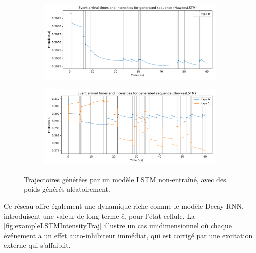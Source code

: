 \documentclass[../main.tex]{subfiles}
\begin{document}
\begin{figure}[!h]
	\begin{subfigure}{\linewidth}
		\includegraphics[width=\linewidth]{../notebooks/example_lstmplot.pdf}
	\end{subfigure}
	\begin{subfigure}{\linewidth}
		\includegraphics[width=\linewidth]{../notebooks/example_lstmplot2d.pdf}
	\end{subfigure}
	\caption{Trajectoires générées par un modèle LSTM non-entraîné, avec des poids générés aléatoirement.}\label{fig:exampleLSTMIntensityTraj}
\end{figure}

Ce réseau offre également une dynamique riche comme le modèle Decay-RNN. \citeauthor{meiEisnerNeuralHawkes} introduisent une valeur de long terme $\bar{c}_i$ pour l'état-cellule. La \autoref{fig:exampleLSTMIntensityTraj} illustre un cas unidimensionnel où chaque événement a un effet auto-inhibiteur immédiat, qui est corrigé par une excitation externe qui s'affaiblit.
\end{document}
